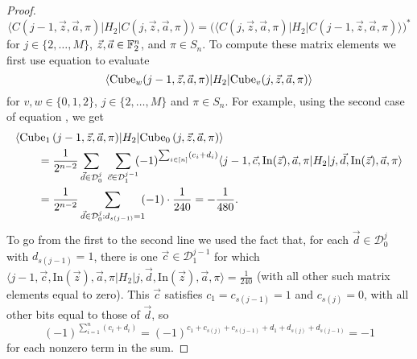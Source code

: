 \documentclass[../thesis-main/thesis-main]{subfiles}
\begin{document}
\begin{proof}
\begin{equation}
  \langle C(j-1,\vec{z},\vec{a},\pi)|H_{2}|C(j,\vec{z},\vec{a},\pi)\rangle = \big(\langle C(j,\vec{z},\vec{a},\pi)|H_{2}|C(j-1,\vec{z},\vec{a},\pi)\rangle\big)^*
\end{equation}
for $j\in\{2,\ldots,M\}$, $\vec{z},\vec{a}\in\mathbb{F}_2^{n}$, and $\pi\in S_n$. To compute these matrix elements we first use equation  to evaluate 
\begin{equation}
  \langle{\operatorname{Cube}_{w}(j-1,\vec{z},\vec{a},\pi)}|H_{2}|{\operatorname{Cube}_{v}(j,\vec{z},\vec{a},\pi)}\rangle
\end{equation}
for $v,w\in\{0,1,2\}$, $j\in\{2,\ldots,M\}$ and $\pi\in S_n$. For example, using the second case of equation , we get
\begin{align}
 & \langle{\operatorname{Cube}_{1}\left(j-1,\vec{z},\vec{a},\pi\right)}|H_{2}|{\operatorname{Cube}_{0}\left(j,\vec{z},\vec{a},\pi\right)}\rangle \nonumber\\
 &\qquad  = 
 \frac{1}{2^{n-2}}\sum_{\vec{d}\in\mathcal{D}_{0}^{j}}\; \sum_{\vec{c}\in\mathcal{D}_{1}^{j-1}} \!\!(-1)^{\sum_{i\in[n]} (c_i +d_i)}\langle j-1,\vec{c},\text{In}(\vec{z}),\vec{a},\pi|H_2|j,\vec{d},\text{In}(\vec{z}),\vec{a},\pi\rangle \\
& \qquad = \frac{1}{2^{n-2}}\sum_{\vec{d}\in\mathcal{D}_{0}^{j}:d_{s(j-1)}=1}\!\!(-1)\cdot\frac{1}{240}=-\frac{1}{480}.
\end{align}
To go from the first to the second line we used the fact that, for each $\vec{d}\in\mathcal{D}_{0}^{j}$ with $d_{s(j-1)}=1$, there is one $\vec{c}\in\mathcal{D}_{1}^{j-1}$ for which $\langle j-1,\vec{c},\text{In}(\vec{z}),\vec{a},\pi|H_2|j,\vec{d},\text{In}(\vec{z}),\vec{a},\pi\rangle=\frac{1}{240}$ (with all other such matrix elements equal to zero). This $\vec{c}$ satisfies $c_1=c_{s(j-1)}=1$ and $c_{s(j)}=0$, with all other bits equal to those of $\vec{d}$, so 
\begin{equation}
(-1)^{\sum_{i=1}^{n}\left(c_{i}+d_{i}\right)}=(-1)^{c_{1}+c_{s(j)}+c_{s(j-1)}+d_{1}+d_{s(j)}+d_{s(j-1)}}=-1
\end{equation}
for each nonzero term in the sum.


\end{proof}
\end{document}
